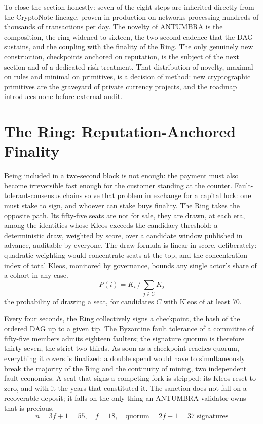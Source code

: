 To close the section honestly: seven of the eight steps are inherited
directly from the CryptoNote lineage, proven in production on networks
processing hundreds of thousands of transactions per day. The
novelty of ANTUMBRA is the composition, the ring widened to sixteen, the
two-second cadence that the DAG sustains, and the coupling with the
finality of the Ring. The only genuinely new construction, checkpoints
anchored on reputation, is the subject of the next section and of a
dedicated risk treatment. That distribution of novelty, maximal on rules
and minimal on primitives, is a decision of method: new cryptographic
primitives are the graveyard of private currency projects, and the
roadmap introduces none before external audit.

\section{The Ring: Reputation-Anchored Finality}\label{sec:ring}

Being included in a two-second block is not enough: the payment must also
become irreversible fast enough for the customer standing at the counter.
Fault-tolerant-consensus chains solve that problem in exchange for a
capital lock: one must stake to sign, and whoever can stake buys
finality. The Ring takes the opposite path. Its fifty-five seats are not
for sale, they are drawn, at each era, among the identities whose Kleos
exceeds the candidacy threshold: a deterministic draw, weighted by score,
over a candidate window published in advance, auditable by everyone. The
draw formula is linear in score, deliberately: quadratic weighting would
concentrate seats at the top, and the concentration index of total Kleos,
monitored by governance, bounds any single actor's share of a cohort in
any case.
\begin{equation}\label{eq:draw}
P(i) = K_i \,\big/\, \sum_{j \in C} K_j
\end{equation}
the probability of drawing a seat, for candidates $C$ with Kleos of at
least 70.

Every four seconds, the Ring collectively signs a checkpoint, the hash of
the ordered DAG up to a given tip. The Byzantine fault tolerance of a
committee of fifty-five members admits eighteen faulters; the signature
quorum is therefore thirty-seven, the strict two thirds. As soon as a
checkpoint reaches quorum, everything it covers is finalized: a double
spend would have to simultaneously break the majority of the Ring and the
continuity of mining, two independent fault economies. A seat that signs
a competing fork is stripped: its Kleos reset to zero, and with it the
years that constituted it. The sanction does not fall on a recoverable
deposit; it falls on the only thing an ANTUMBRA validator owns that is
precious.
\begin{equation}\label{eq:bft}
n = 3f + 1 = 55,\quad f = 18,\quad \text{quorum} = 2f + 1 = 37 \text{ signatures}
\end{equation}

